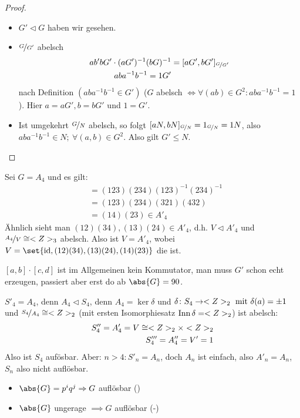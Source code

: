 \begin{proof}
	\begin{itemize}
		\item $G' \lhd G$ haben wir gesehen.
		\item $\lnkset{G}{G'}$ abelsch
		\begin{align*}
			ab' bG'\cdot (aG')^{-1}(bG)^{-1} &= [aG',bG']_{\lnkset{G}{G'}}\\
			aba^{-1}b^{-1} = 1G'
		\end{align*}
		nach Definition $(aba^{-1}b^{-1} \in G')$ ($G$ abelsch $\Leftrightarrow \forall (ab) \in G^2\colon aba^{-1}b^{-1} = 1$). Hier $a = aG', b = bG'$ und $1 = G'$.
		\item Ist umgekehrt $\lnkset{G}{N}$ abelsch, so folgt $[aN, bN]_{\lnkset{G}{N}} = 1_{\lnkset{G}{N}} = 1N$, also $aba^{-1}b^{-1} \in N;\ \forall (a,b) \in G^2$. Also gilt $G' \le N$.
	\end{itemize}
\end{proof}
\begin{*example}
	Sei $G = A_4$ und es gilt:
	\begin{align*}
		[(123),(234)] &= (123)(234)(123)^{-1}(234)^{-1}\\
		&= (123)(234)(321)(432)\\
		&= (14)(23)\in A'_4
	\end{align*}
	Ähnlich sieht man $(12)(34), (13)(24) \in A'_4$, d.h. $V \lhd A'_4$ und $\lnkset{A_4}{V} \cong \Z_3$ abelsch. Also ist $V = A'_4$, wobei $V = \set{\id, (12)(34),(13)(24),(14)(23)}$ die  ist.
\end{*example}
\begin{*remark}
	$[a,b]\cdot [c,d]$ ist im Allgemeinen kein Kommutator, man muss $G'$ schon echt erzeugen, passiert aber erst do ab $\abs{G} = 90$.
\end{*remark}
\begin{*example}
	$S'_4 = A_4$, denn $A_4 \lhd S_4$, denn $A_4 = \ker \delta$ und $\delta\colon S_4 \to <Z>_2 \text{ mit } \delta(a) = \pm 1$ und $\lnkset{S_4}{A_4} \cong \Z_2$ (mit ersten Isomorphiesatz $\operatorname{Inn} \delta = <Z>_2$) ist abelsch:
	\begin{align*}
		S''_4 = A'_4 = V \cong <Z>_2 \times <Z>_2\\
		S'''_4 = A''_4 = V' = 1
	\end{align*}
	Also ist $S_4$ aufösbar. Aber: $n > 4\colon S'_n = A_n$, doch $A_n$ ist einfach, also $A'_n = A_n$, $S_n$ also nicht auflösbar.
\end{*example}
\begin{*remark}
	\begin{itemize}
		\item $\abs{G} = p^i q^j \implies G$ auflösbar ()
		\item $\abs{G}$ ungerage $\implies G$ auflösbar (-)
	\end{itemize}
\end{*remark}
